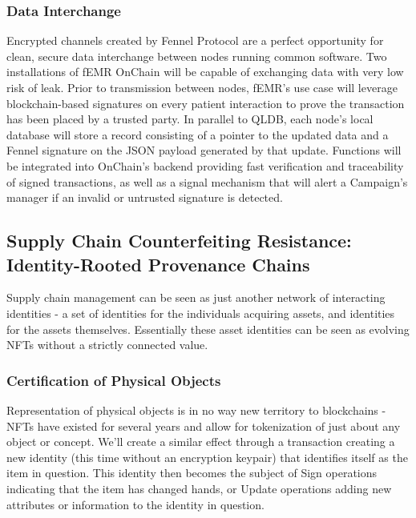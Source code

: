 \documentclass[]{article}
\begin{document}
\subsubsection{Data Interchange}
\label{scrivauto:36}

Encrypted channels created by Fennel Protocol are a perfect opportunity for clean, secure data interchange between nodes running common software. Two installations of fEMR OnChain will be capable of exchanging data with very low risk of leak.
Prior to transmission between nodes, fEMR's use case will leverage blockchain-based signatures on every patient interaction to prove the transaction has been placed by a trusted party. In parallel to QLDB, each node's local database will store a record consisting of a pointer to the updated data and a Fennel signature on the JSON payload generated by that update. Functions will be integrated into OnChain's backend providing fast verification and traceability of signed transactions, as well as a signal mechanism that will alert a Campaign's manager if an invalid or untrusted signature is detected.

\subsection{Supply Chain Counterfeiting Resistance: Identity-Rooted Provenance Chains}
\label{scrivauto:37}

Supply chain management can be seen as just another network of interacting identities - a set of identities for the individuals acquiring assets, and identities for the assets themselves. Essentially these asset identities can be seen as evolving NFTs without a strictly connected value.

\subsubsection{Certification of Physical Objects}
\label{scrivauto:38}

Representation of physical objects is in no way new territory to blockchains - NFTs have existed for several years and allow for tokenization of just about any object or concept. We'll create a similar effect through a transaction creating a new identity (this time without an encryption keypair) that identifies itself as the item in question. This identity then becomes the subject of Sign operations indicating that the item has changed hands, or Update operations adding new attributes or information to the identity in question.
\end{document}
